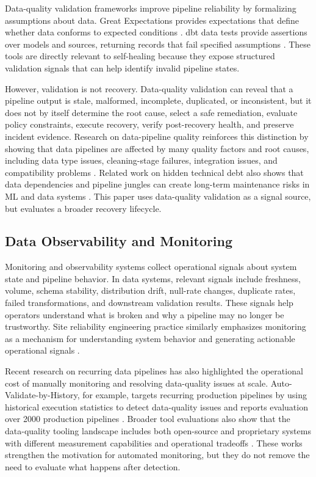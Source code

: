 Data-quality validation frameworks improve pipeline reliability by formalizing assumptions about data. Great Expectations provides expectations that define whether data conforms to expected conditions \cite{greatexpectations2026}. dbt data tests provide assertions over models and sources, returning records that fail specified assumptions \cite{dbt2026datatests}. These tools are directly relevant to self-healing because they expose structured validation signals that can help identify invalid pipeline states.

However, validation is not recovery. Data-quality validation can reveal that a pipeline output is stale, malformed, incomplete, duplicated, or inconsistent, but it does not by itself determine the root cause, select a safe remediation, evaluate policy constraints, execute recovery, verify post-recovery health, and preserve incident evidence. Research on data-pipeline quality reinforces this distinction by showing that data pipelines are affected by many quality factors and root causes, including data type issues, cleaning-stage failures, integration issues, and compatibility problems \cite{foidl2023pipelinequality}. Related work on hidden technical debt also shows that data dependencies and pipeline jungles can create long-term maintenance risks in ML and data systems \cite{sculley2015hidden}. This paper uses data-quality validation as a signal source, but evaluates a broader recovery lifecycle.

\subsection{Data Observability and Monitoring}


Monitoring and observability systems collect operational signals about system state and pipeline behavior. In data systems, relevant signals include freshness, volume, schema stability, distribution drift, null-rate changes, duplicate rates, failed transformations, and downstream validation results. These signals help operators understand what is broken and why a pipeline may no longer be trustworthy. Site reliability engineering practice similarly emphasizes monitoring as a mechanism for understanding system behavior and generating actionable operational signals \cite{googlesre2026monitoring}.

Recent research on recurring data pipelines has also highlighted the operational cost of manually monitoring and resolving data-quality issues at scale. Auto-Validate-by-History, for example, targets recurring production pipelines by using historical execution statistics to detect data-quality issues and reports evaluation over 2000 production pipelines \cite{tu2023autovalidate}. Broader tool evaluations also show that the data-quality tooling landscape includes both open-source and proprietary systems with different measurement capabilities and operational tradeoffs \cite{rehberger2026dqtools}. These works strengthen the motivation for automated monitoring, but they do not remove the need to evaluate what happens after detection.

